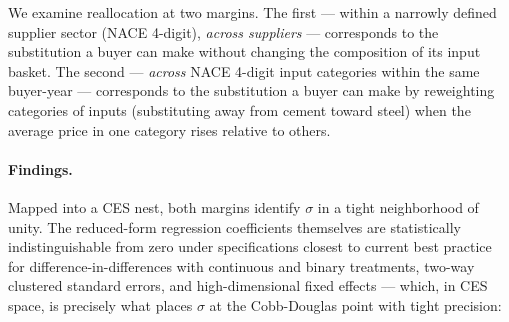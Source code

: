 We examine reallocation at two margins. The first --- within a narrowly defined supplier sector (NACE 4-digit), \emph{across suppliers} --- corresponds to the substitution a buyer can make without changing the composition of its input basket. The second --- \emph{across} NACE 4-digit input categories within the same buyer-year --- corresponds to the substitution a buyer can make by reweighting categories of inputs (\eg substituting away from cement toward steel) when the average price in one category rises relative to others.

\paragraph{Findings.} Mapped into a CES nest, both margins identify $\sigma$ in a tight neighborhood of unity. The reduced-form regression coefficients themselves are statistically indistinguishable from zero under specifications closest to current best practice for difference-in-differences with continuous and binary treatments, two-way clustered standard errors, and high-dimensional fixed effects --- which, in CES space, is precisely what places $\sigma$ at the Cobb-Douglas point with tight precision:

